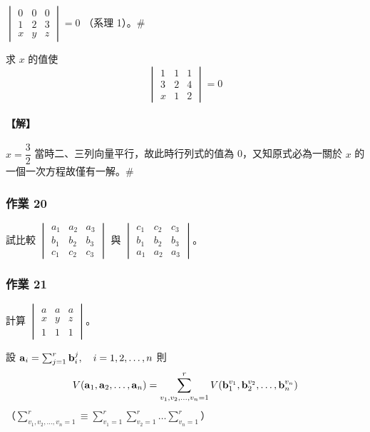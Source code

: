 \begin{example}\label{ex:b6-1-17}
$\begin{vmatrix} 0 & 0 & 0 \\ 1 & 2 & 3 \\ x & y & z \end{vmatrix} = 0$ （系理 1）。\hfill$\#$
\end{example}

\begin{example}\label{ex:b6-1-18}
求 $x$ 的值使
\[ \begin{vmatrix} 1 & 1 & 1 \\ 3 & 2 & 4 \\ x & 1 & 2 \end{vmatrix} = 0 \]
\end{example}

\paragraph{【解】}
$x = \dfrac{3}{2}$ 當時二、三列向量平行，故此時行列式的值為 0，又知原式必為一關於 $x$ 的一個一次方程故僅有一解。\hfill$\#$

\subsubsection*{作業 20}\label{hw:b6-1-20}
試比較 $\begin{vmatrix} a_1 & a_2 & a_3 \\ b_1 & b_2 & b_3 \\ c_1 & c_2 & c_3 \end{vmatrix}$ 與 $\begin{vmatrix} c_1 & c_2 & c_3 \\ b_1 & b_2 & b_3 \\ a_1 & a_2 & a_3 \end{vmatrix}$。

\subsubsection*{作業 21}\label{hw:b6-1-21}
計算 $\begin{vmatrix} a & a & a \\ x & y & z \\ 1 & 1 & 1 \end{vmatrix}$。

\begin{theorem}\label{thm:b6-1-7}
設 $\boldsymbol{\mathbf{a}}_i = \sum_{j=1}^r \boldsymbol{\mathbf{b}}_i^j, \quad i=1, 2, \dots, n$
則
\[ V(\boldsymbol{\mathbf{a}}_1, \boldsymbol{\mathbf{a}}_2, \dots, \boldsymbol{\mathbf{a}}_n) = \sum_{v_1, v_2, \dots, v_n=1}^r V(\boldsymbol{\mathbf{b}}_1^{v_1}, \boldsymbol{\mathbf{b}}_2^{v_2}, \dots, \boldsymbol{\mathbf{b}}_n^{v_n}) \]
（$\sum_{v_1, v_2, \dots, v_n=1}^r \equiv \sum_{v_1=1}^r \sum_{v_2=1}^r \dots \sum_{v_n=1}^r$）
\end{theorem}

